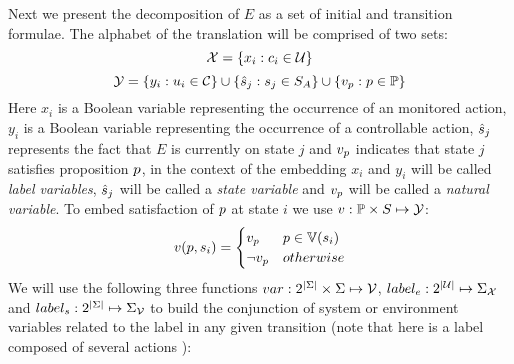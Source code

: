 %
Next we present the decomposition of $E$ as a set of initial and transition formulae.
The alphabet of the translation will be comprised of two sets:
\[{\mathcal{X}} = \{x_i : c_i \in \mathcal{U} \}\]
\[{\mathcal{Y}} = \{y_i : u_i \in \mathcal{C} \} \cup \{\hat{s}_{j} : s_j \in S_A \} \cup \{v_{p} : p \in \mathbb{P}\}\]
Here $x_i$ is a Boolean variable representing the occurrence of an monitored action, $y_i$ is a Boolean variable representing the occurrence of a controllable action, $\hat{s}_{j}$ represents the fact that $E$ is currently on state $j$ and $v_{p}$ indicates that state $j$ satisfies proposition $p$,  in the context of the embedding $x_i$ and $y_i$ will be called \emph{label variables}, $\hat{s}_{j}$ will be called a \emph{state variable} and $v_{p}$ will be called a \emph{natural variable}.
To embed satisfaction of $p$ at state $i$ we use $v:\mathbb{P} \times S \mapsto {\mathcal{Y}}$:
\[
v(p,s_i) = \begin{cases}
v_{p} & p \in \mathbb{V}(s_i) \\
\neg v_{p} & otherwise
\end{cases}
\]
We will use the following three functions $var:2^{|\Sigma|}\times \Sigma \mapsto {\mathcal{V}}$, $label_e:2^{|\mathcal{U}|}\mapsto \Sigma_{{\mathcal{X}}}$ and $label_s:2^{|\Sigma|}\mapsto \Sigma_{{\mathcal{V}}}$ to build the conjunction of system or environment variables related to the label in any given transition (note that here \actionLabel is a label composed of several actions \action):
